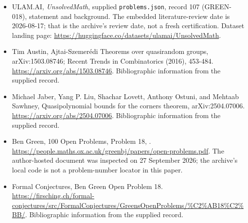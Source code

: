 \documentclass[11pt,a4paper]{article}
\begin{document}
{\small

\begin{itemize}

\item[\hypertarget{source:107:1}{S1}] ULAM.AI, \emph{UnsolvedMath}, supplied \texttt{problems.json}, record 107 (GREEN-018), statement and background. The embedded literature-review date is 2026-08-17; that is the archive’s review date, not a fresh certification. Dataset landing page: \url{https://huggingface.co/datasets/ulamai/UnsolvedMath}.

\item[\hypertarget{source:107:2}{S2}] Tim Austin, Ajtai-Szemerédi Theorems over quasirandom groups, arXiv:1503.08746; Recent Trends in Combinatorics (2016), 453-484. \url{https://arxiv.org/abs/1503.08746}. Bibliographic information from the supplied record.

\item[\hypertarget{source:107:3}{S3}] Michael Jaber, Yang P. Liu, Shachar Lovett, Anthony Ostuni, and Mehtaab Sawhney, Quasipolynomial bounds for the corners theorem, arXiv:2504.07006. \url{https://arxiv.org/abs/2504.07006}. Bibliographic information from the supplied record.

\item[\hypertarget{source:107:4}{S4}] Ben Green, 100 Open Problems, Problem 18, . \url{https://people.maths.ox.ac.uk/greenbj/papers/open-problems.pdf}. The author-hosted document was inspected on 27 September 2026; the archive’s local code is not a problem-number locator in this paper.

\item[\hypertarget{source:107:5}{S5}] Formal Conjectures, Ben Green Open Problem 18. \url{https://firsching.ch/formal-conjectures/src/FormalConjectures/GreensOpenProblems/%C2%AB18%C2%BB/}. Bibliographic information from the supplied record.

\end{itemize}

}

\label{end:107}
\end{document}
